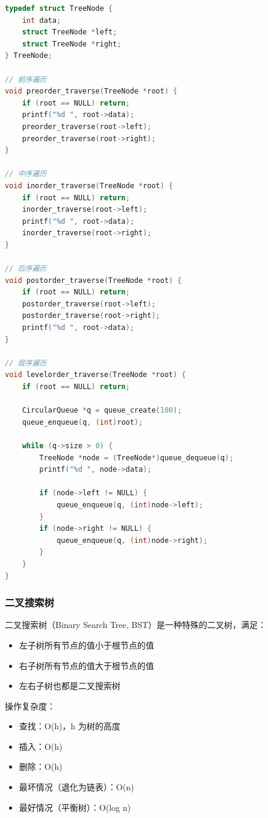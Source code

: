 \begin{lstlisting}[language=C, caption={二叉树节点定义和遍历}]
typedef struct TreeNode {
    int data;
    struct TreeNode *left;
    struct TreeNode *right;
} TreeNode;

// 前序遍历
void preorder_traverse(TreeNode *root) {
    if (root == NULL) return;
    printf("%d ", root->data);
    preorder_traverse(root->left);
    preorder_traverse(root->right);
}

// 中序遍历
void inorder_traverse(TreeNode *root) {
    if (root == NULL) return;
    inorder_traverse(root->left);
    printf("%d ", root->data);
    inorder_traverse(root->right);
}

// 后序遍历
void postorder_traverse(TreeNode *root) {
    if (root == NULL) return;
    postorder_traverse(root->left);
    postorder_traverse(root->right);
    printf("%d ", root->data);
}

// 层序遍历
void levelorder_traverse(TreeNode *root) {
    if (root == NULL) return;

    CircularQueue *q = queue_create(100);
    queue_enqueue(q, (int)root);

    while (q->size > 0) {
        TreeNode *node = (TreeNode*)queue_dequeue(q);
        printf("%d ", node->data);

        if (node->left != NULL) {
            queue_enqueue(q, (int)node->left);
        }
        if (node->right != NULL) {
            queue_enqueue(q, (int)node->right);
        }
    }
}
\end{lstlisting}

\subsubsection{二叉搜索树}

二叉搜索树（Binary Search Tree, BST）是一种特殊的二叉树，满足：
\begin{itemize}
  \item 左子树所有节点的值小于根节点的值
  \item 右子树所有节点的值大于根节点的值
  \item 左右子树也都是二叉搜索树
\end{itemize}

操作复杂度：
\begin{itemize}
  \item 查找：O(h)，h 为树的高度
  \item 插入：O(h)
  \item 删除：O(h)
  \item 最坏情况（退化为链表）：O(n)
  \item 最好情况（平衡树）：O(log n)
\end{itemize}

